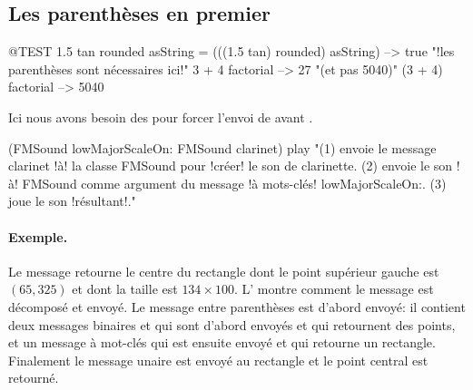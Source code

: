 \documentclass[a4paper,10pt,twoside]{book}
\begin{document}
\subsection{Les parenth\`eses en premier}


\begin{code}{@TEST}
1.5 tan rounded asString = (((1.5 tan) rounded) asString) --> true    "!les parenth\`eses sont n\'ecessaires ici!"
3 + 4 factorial   --> 27    "(et pas 5040)"
(3 + 4) factorial --> 5040
\end{code}

Ici nous avons besoin des  pour forcer l'envoi de  avant .
\begin{code}{}
(FMSound lowMajorScaleOn: FMSound clarinet) play 
"(1) envoie le message clarinet !\`a! la classe FMSound pour !cr\'eer! le son de clarinette.
 (2) envoie le son !\`a! FMSound comme argument du message !\`a mots-cl\'es! lowMajorScaleOn:.
 (3) joue le son !r\'esultant!."
\end{code}



\paragraph{Exemple.}
Le message  retourne le centre
du rectangle dont le point sup\'erieur gauche est $(65, 325)$ et dont
la taille est $134{\times}100$. L' montre comment le
message est d\'ecompos\'e et envoy\'e. Le message entre parenth\`eses
est d'abord envoy\'e: il contient deux messages binaires 
et  qui sont d'abord envoy\'es et qui retournent des
points, et un message \`a mot-cl\'es  qui est ensuite
envoy\'e et qui retourne un rectangle. Finalement le message unaire
 est envoy\'e au rectangle et le point central est retourn\'e.
\end{document}
